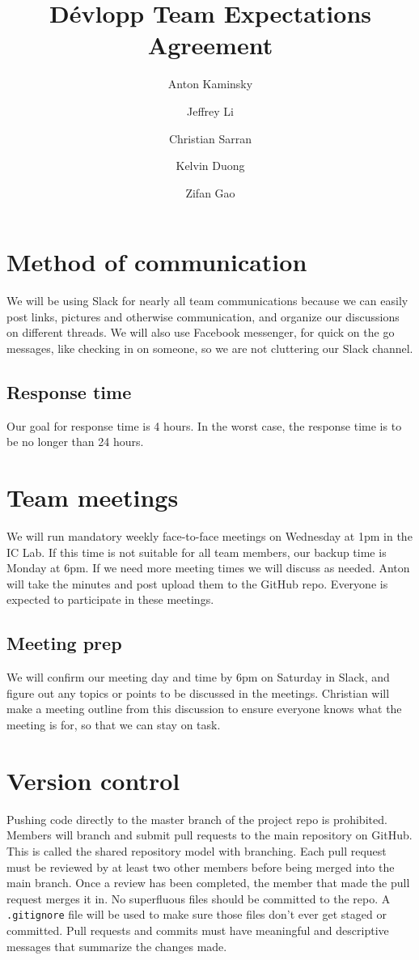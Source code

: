\documentclass[12pt]{scrartcl}
\author{Anton Kaminsky \and Jeffrey Li \and Christian Sarran \and Kelvin Duong \and Zifan Gao}
\title{D\'evlopp Team Expectations Agreement}
\begin{document}
\maketitle

\section{Method of communication}
We will be using Slack for nearly all team communications because we can easily post links, pictures and otherwise communication, and organize our discussions on different threads. We will also use Facebook messenger, for quick on the go messages, like checking in on someone, so we are not cluttering our Slack channel. 

\subsection{Response time}
Our goal for response time is 4 hours. In the worst case, the response time is to be no longer than 24 hours.

\section{Team meetings}
We will run mandatory weekly face-to-face meetings on Wednesday at 1pm in the IC Lab. If this time is not suitable for all team members, our backup time is Monday at 6pm. If we need more meeting times we will discuss as needed. Anton will take the minutes and post upload them to the GitHub repo. Everyone is expected to participate in these meetings.

\subsection{Meeting prep}
We will confirm our meeting day and time by 6pm on Saturday in Slack, and figure out any topics or points to be discussed in the meetings. Christian will make a meeting outline from this discussion to ensure everyone knows what the meeting is for, so that we can stay on task.

\section{Version control}
Pushing code directly to the master branch of the project repo is prohibited. Members will branch and submit pull requests to the main repository on GitHub. This is called the shared repository model with branching. Each pull request must be reviewed by at least two other members before being merged into the main branch. Once a review has been completed, the member that made the pull request merges it in. No superfluous files should be committed to the repo. A \texttt{.gitignore} file will be used to make sure those files don't ever get staged or committed. Pull requests and commits must have meaningful and descriptive messages that summarize the changes made.
\end{document}
